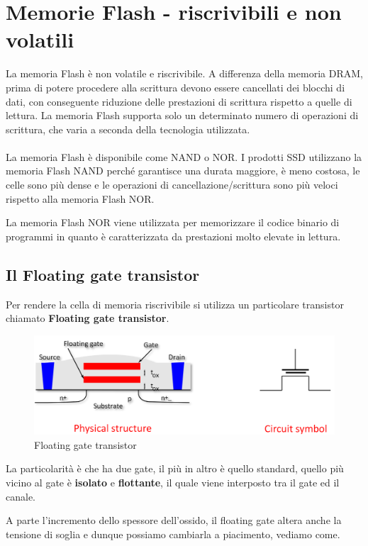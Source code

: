 \newpage
\section{Memorie Flash - riscrivibili e non volatili}
La memoria Flash è non volatile e riscrivibile. A differenza della memoria DRAM,
prima di potere procedere alla scrittura devono essere cancellati dei blocchi di dati,
con conseguente riduzione delle prestazioni di scrittura rispetto a quelle di lettura.
La memoria Flash supporta solo un determinato numero di operazioni di scrittura, che
varia a seconda della tecnologia utilizzata.

\paragraph{}
La memoria Flash è disponibile come NAND o NOR. I prodotti SSD utilizzano la memoria
Flash NAND perché garantisce una durata maggiore, è meno costosa, le celle sono più
dense e le operazioni di cancellazione/scrittura sono più veloci rispetto alla memoria
Flash NOR. 

La memoria Flash NOR viene utilizzata per memorizzare il codice binario
di programmi in quanto è caratterizzata da prestazioni molto elevate in lettura.

\subsection{Il Floating gate transistor}

Per rendere la cella di memoria riscrivibile si utilizza un particolare transistor chiamato \textbf{Floating gate transistor}.


\begin{figure}[htbp]
    \centering
    \includegraphics[width=0.5\linewidth]{img/mhgytf.png}
    \caption{Floating gate transistor}
\end{figure}

La particolarità è che ha due gate, il più in altro è quello standard, quello più vicino al gate è \textbf{isolato} e \textbf{flottante}, il quale viene interposto tra il gate ed il canale. 

A parte l’incremento dello spessore dell'ossido, il floating gate altera anche la tensione di soglia e dunque possiamo cambiarla a piacimento, vediamo come.

